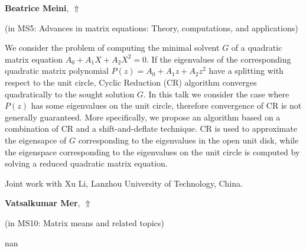 \documentclass[ILAS2025-program.tex]{subfiles}
\begin{document}
\hypertarget{down0064}{}\begin{ilasabstract}
    
\textbf{Beatrice Meini},  \hfill \hyperlink{up0064}{$\Uparrow$}
    
    
(in {\color{mstitle}MS5: Advances in matrix equations: Theory, computations, and applications})
        
\mtskip
    We consider the problem of computing the minimal solvent $G$ of a quadratic matrix equation $A_0+A_1X+A_2X^2=0$.  If the eigenvalues of the corresponding quadratic matrix polynomial $P(z)=A_0+A_1z+A_2z^2$ have a splitting with respect to the unit circle, Cyclic Reduction (CR) algorithm converges quadratically to the sought solution $G$.
In this talk we consider the case where $P(z)$ has some eigenvalues on the unit circle, therefore convergence of CR is not generally guaranteed. 
More specifically, we propose an algorithm based on a combination of CR and a shift-and-deflate technique. CR is used to approximate the eigensapce of $G$ corresponding to the eigenvalues in the open unit disk, while the eigenspace corresponding to the eigenvalues on the unit circle is computed by solving a reduced quadratic matrix equation.


\smallskip\noindent
Joint work with Xu Li, Lanzhou University of Technology, China.

\end{ilasabstract}
    

\hypertarget{down0056}{}\begin{ilasabstract}
    
\textbf{Vatsalkumar Mer},  \hfill \hyperlink{up0056}{$\Uparrow$}
    
    
(in {\color{mstitle}MS10: Matrix means and related topics})
        
\mtskip
    nan
\end{ilasabstract}
    
\end{document}
